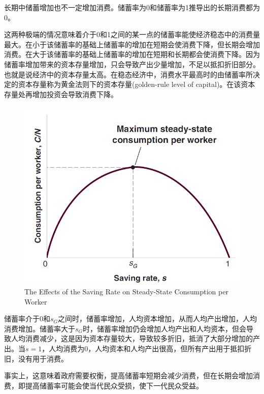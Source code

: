 \documentclass{article}
\begin{document}
长期中储蓄增加也不一定增加消费。储蓄率为0和储蓄率为1推导出的长期消费都为0。

这两种极端的情况意味着介于0和1之间的某一点的储蓄率能使经济稳态中的消费量最大。在小于该储蓄率的基础上储蓄率的增加在短期会使消费下降，但长期会增加消费。在大于该储蓄率的基础上储蓄率的增加在短期和长期都会使消费下降。因为储蓄率增加带来的资本存量增加，只会导致产出少量增加，不足以抵扣折旧部分。也就是说经济中的资本存量太高。在稳态经济中，消费水平最高时的由储蓄率所决定的资本存量称为黄金法则下的资本存量(golden-rule level of capital)。在该资本存量处再增加投资会导致消费下降。

\begin{figure}[H] %
	\centering %
	\includegraphics[width=1\textwidth]{11_6} %
	\caption{The Effects of the Saving
		Rate on Steady-State
		Consumption per Worker} %
	\label{Fig.main7} %
\end{figure}

储蓄率介于0和$ s_G $之间时，储蓄率增加，人均资本增加，从而人均产出增加，人均消费增加。储蓄率大于$ s_G $时，储蓄率增加仍会增加人均产出和人均资本，但会导致人均消费减少，这是因为资本存量较大，导致较多折旧，抵消了大部分增加的产出。当$ s=1 $，人均消费为0，人均资本和人均产出很高，但所有产出用于抵扣折旧，没有用于消费。

事实上，这意味着政府需要权衡，提高储蓄率短期会减少消费，但在长期会增加消费，即提高储蓄率可能会使当代民众受损，使下一代民众受益。
\end{document}
